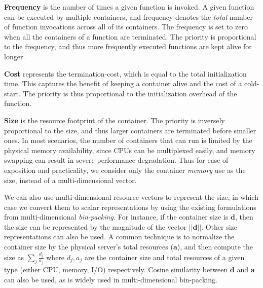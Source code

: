 \noindent \textbf{Frequency} is the number of times a given function is invoked.
A given function can be executed by multiple containers, and frequency denotes the \emph{total} number of function invocations across all of its containers. 
The frequency is set to zero when all the containers of a function are terminated.
The priority is proportional to the frequency, and thus more frequently executed functions are kept alive for longer. 
%
%


\noindent \textbf{Cost} represents the termination-cost, which is equal to the total initialization time. 
This captures the benefit of keeping a container alive and the cost of a cold-start. 
The priority is thus proportional to the initialization overhead of the function. 



\noindent \textbf{Size} is the resource footprint of the container. 
The priority is inversely proportional to the size, and thus larger containers are terminated before smaller ones. 
In most scenarios, the number of containers that can run is limited by the physical memory availability, since CPUs can be multiplexed easily, and memory swapping can result in severe performance degradation.
Thus for ease of exposition and practicality, we consider only the container \emph{memory} use as the size, instead of a multi-dimensional vector. 


We can also use multi-dimensional resource vectors to represent the size, in which case we convert them to scalar representations by using the existing formulations from multi-dimensional \emph{bin-packing.}
For instance, if the container size is $\mathbf{d}$, then the size can be represented by the magnitude of the vector $||\mathbf{d}||$.
Other size representations can also be used.
A common technique is to normalize the container size by the physical server's total resources ($\mathbf{a}$), and then compute the size as $\sum_j \frac{d_j}{a_j}$ where $d_j, a_j$ are the container size and total resources of a given type (either CPU, memory, I/O) respectively.
Cosine similarity between $\mathbf{d}$ and $\mathbf{a}$ can also be used, as is widely used in multi-dimensional bin-packing.  


